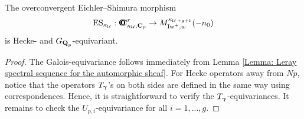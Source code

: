\begin{Proposition}\label{Proposition: OES for sheaves on the pro-Kummer etale site}
The overconvergent Eichler--Shimura morphism\[
    \operatorname{ES}_{\kappa_{\operatorname{\mathcal{U}}}}: \operatorname{\mathbf{O}\!\!\!\!\mathbf{C}}_{\kappa_{\operatorname{\mathcal{U}}}, \operatorname{\mathbf{C}}_p}^{r} \rightarrow M_{\operatorname{Iw}^+, w}^{\kappa_{\operatorname{\mathcal{U}}+g+1}}(-n_0)
\] is Hecke- and $G_{\operatorname{\mathbf{Q}}_p}$-equivariant. 
\end{Proposition}
\begin{proof}
The Galois-equivariance follows immediately from Lemma \ref{Lemma: Leray spectral sequence for the automorphic sheaf}. For Hecke operators away from $Np$, notice that the operators $T_{\operatorname{\boldsymbol{\gamma}}}$'s on both sides are defined in the same way using correspondences. Hence, it is straightforward to verify the $T_{\operatorname{\boldsymbol{\gamma}}}$-equivariances. It remains to check the $U_{p,i}$-equivariance for all $i=1, ..., g$.


\end{proof}
